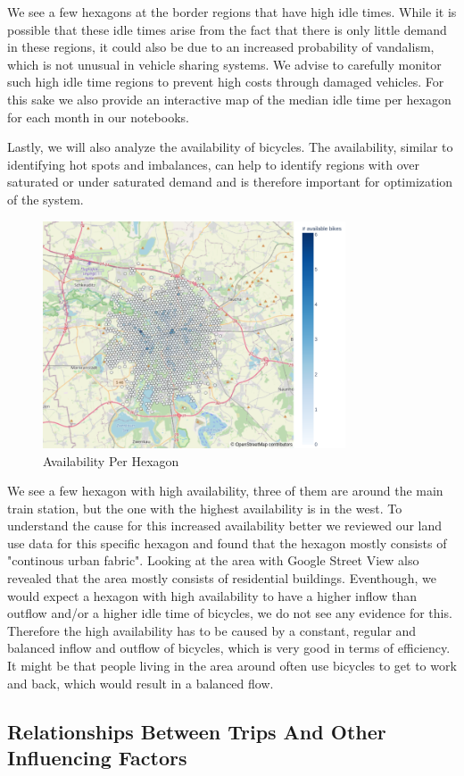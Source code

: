 We see a few hexagons at the border regions that have high idle times.
While it is possible that these idle times arise from the fact that there is only little demand in these regions, it could also be due to an increased probability of vandalism, which is not unusual in vehicle sharing systems.
We advise to carefully monitor such high idle time regions to prevent high costs through damaged vehicles.
For this sake we also provide an interactive map of the median idle time per hexagon for each month in our notebooks.

Lastly, we will also analyze the availability of bicycles. The availability,
similar to identifying hot spots and imbalances, can help to identify regions
with over saturated or under saturated demand and is therefore important for
optimization of the system.


\begin{figure}[htb]
    \centering
    \includegraphics[width=0.8\textwidth]{figures/descriptive_analysis/availability_per_hexagon.png}
    \caption{Availability Per Hexagon}
    \label{fig:descriptive_analysis_availability_per_hexagon}
\end{figure}

We see a few hexagon with high availability, three of them are around the main
train station, but the one with the highest availability is in the west. To
understand the cause for this increased availability better we reviewed our
land use data for this specific hexagon and found that the hexagon mostly
consists of "continous urban fabric". Looking at the area with Google Street
View also revealed that the area mostly consists of residential buildings.
Eventhough, we would expect a hexagon with high availability to have a higher
inflow than outflow and/or a higher idle time of bicycles, we do not see any
evidence for this. Therefore the high availability has to be caused by a constant,
regular and balanced inflow and outflow of bicycles, which is very good in
terms of efficiency. It might be that people living in the area around often
use bicycles to get to work and back, which would result in a balanced flow.


\subsection{Relationships Between Trips And Other Influencing Factors}
\label{subsec:descriptive_analysis_relationships}
